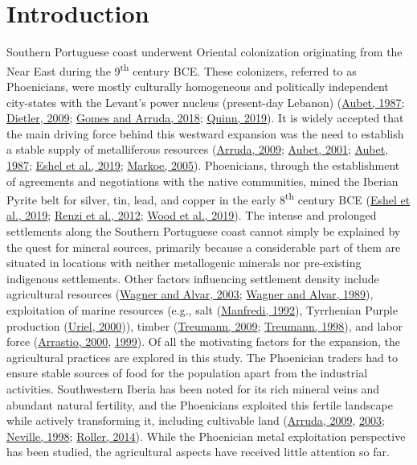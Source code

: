 \documentclass[preprint, 3p, authoryear]{elsarticle} %
\begin{document}
\hypertarget{introduction}{%
\section{Introduction}\label{introduction}}

Southern Portuguese coast underwent Oriental colonization originating from the Near East during the 9\textsuperscript{th} century BCE. These colonizers, referred to as Phoenicians, were mostly culturally homogeneous and politically independent city-states with the Levant's power nucleus (present-day Lebanon) (\protect\hyperlink{ref-aubet87}{Aubet, 1987}; \protect\hyperlink{ref-dietler09}{Dietler, 2009}; \protect\hyperlink{ref-gomes_arruda18}{Gomes and Arruda, 2018}; \protect\hyperlink{ref-quinn19}{Quinn, 2019}). It is widely accepted that the main driving force behind this westward expansion was the need to establish a stable supply of metalliferous resources (\protect\hyperlink{ref-arruda09}{Arruda, 2009}; \protect\hyperlink{ref-aubet01}{Aubet, 2001}; \protect\hyperlink{ref-aubet87}{Aubet, 1987}; \protect\hyperlink{ref-eshel_etal19}{Eshel et al., 2019}; \protect\hyperlink{ref-markoe05}{Markoe, 2005}). Phoenicians, through the establishment of agreements and negotiations with the native communities, mined the Iberian Pyrite belt for silver, tin, lead, and copper in the early 8\textsuperscript{th} century BCE (\protect\hyperlink{ref-eshel_etal19}{Eshel et al., 2019}; \protect\hyperlink{ref-renzi_etal12}{Renzi et al., 2012}; \protect\hyperlink{ref-wood_etal19}{Wood et al., 2019}). The intense and prolonged settlements along the Southern Portuguese coast cannot simply be explained by the quest for mineral sources, primarily because a considerable part of them are situated in locations with neither metallogenic minerals nor pre-existing indigenous settlements. Other factors influencing settlement density include agricultural resources (\protect\hyperlink{ref-wagner_alvar03}{Wagner and Alvar, 2003}; \protect\hyperlink{ref-wagner_alvar89}{Wagner and Alvar, 1989}), exploitation of marine resources (e.g., salt (\protect\hyperlink{ref-manfredi92}{Manfredi, 1992}), Tyrrhenian Purple production (\protect\hyperlink{ref-uriel00}{Uriel, 2000})), timber (\protect\hyperlink{ref-treumann09}{Treumann, 2009}; \protect\hyperlink{ref-treumann98}{Treumann, 1998}), and labor force (\protect\hyperlink{ref-arrastio00}{Arrastio, 2000}, \protect\hyperlink{ref-arrastio99}{1999}). Of all the motivating factors for the expansion, the agricultural practices are explored in this study. The Phoenician traders had to ensure stable sources of food for the population apart from the industrial activities. Southwestern Iberia has been noted for its rich mineral veins and abundant natural fertility, and the Phoenicians exploited this fertile landscape while actively transforming it, including cultivable land (\protect\hyperlink{ref-arruda09}{Arruda, 2009}, \protect\hyperlink{ref-arruda03}{2003}; \protect\hyperlink{ref-neville98}{Neville, 1998}; \protect\hyperlink{ref-roller14}{Roller, 2014}). While the Phoenician metal exploitation perspective has been studied, the agricultural aspects have received little attention so far.
\end{document}
